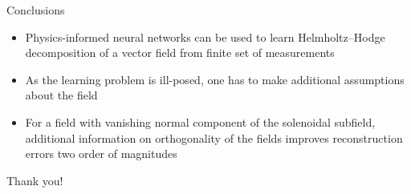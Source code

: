 \documentclass[11pt,aspectratio=169,t]{beamer}
\begin{document}


\begin{frame}{Conclusions}
\begin{itemize}
    \item Physics-informed neural networks can be used to learn Helmholtz--Hodge
        decomposition of a vector field from finite set of measurements
    \item As the learning problem is ill-posed, one has to make additional
        assumptions about the field
    \item For a field with vanishing normal component of the solenoidal subfield,
        additional information on orthogonality of the fields improves
        reconstruction errors two order of magnitudes
\end{itemize}
\end{frame}

\begin{frame}[standout]
\centering
\Huge
Thank you!
\end{frame}
\end{document}
